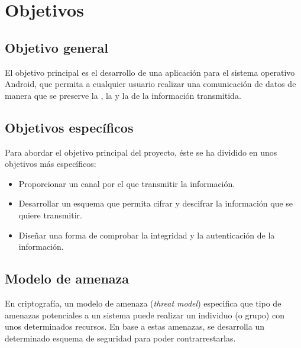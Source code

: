 
\chapter{Objetivos} %

\label{Chapter2}


\section{Objetivo general}

El objetivo principal es el desarrollo de una aplicación para el sistema operativo
Android, que permita a cualquier usuario realizar una comunicación de datos
de manera que se preserve la , la 
y la  de la información transmitida.


\section{Objetivos específicos}

Para abordar el objetivo principal del proyecto, éste se ha dividido en unos
objetivos más específicos:

\begin{itemize}
  \item Proporcionar un canal por el que transmitir la información.
  \item Desarrollar un esquema que permita cifrar y descifrar la información que se quiere transmitir.
  \item Diseñar una forma de comprobar la integridad y la autenticación de la información.
\end{itemize}


\section{Modelo de amenaza}

En criptografía, un modelo de amenaza (\emph{threat model}) especifica que tipo
de amenazas potenciales a un sistema puede realizar un individuo (o grupo) con
unos determinados recursos. En base a estas amenazas, se desarrolla un
determinado esquema de seguridad para poder contrarrestarlas.

